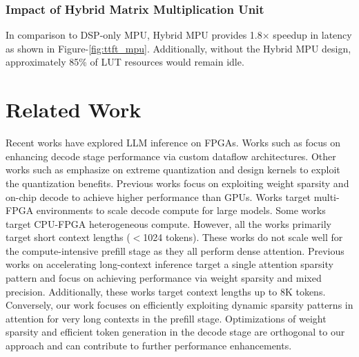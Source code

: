 \documentclass[conference]{IEEEtran}
\begin{document}
\subsubsection{Impact of Hybrid Matrix Multiplication Unit}
In comparison to DSP-only MPU, Hybrid MPU provides 1.8$\times$ speedup in latency as shown in Figure-\ref{fig:ttft_mpu}. Additionally, without the Hybrid MPU design, approximately 85\% of LUT resources would remain idle. 

\section{Related Work}
Recent works \cite{flightllm, speedllm, edgellm, embedfpga, lutllm, terrific, cdllm, lembda, tellme, terafly, looplynx} have explored LLM inference on FPGAs. Works such as \cite{embedfpga, terafly, cdllm} focus on enhancing decode stage performance via custom dataflow architectures. Other works such as \cite{terrific, tellme, lutllm} emphasize on extreme quantization and design kernels to exploit the quantization benefits. Previous works \cite{flightllm} focus on exploiting weight sparsity and on-chip decode to achieve higher performance than GPUs. Works \cite{looplynx} target multi-FPGA environments to scale decode compute for large models. Some works \cite{cdllm, edgellm} target CPU-FPGA heterogeneous compute. However, all the works primarily target short context lengths ($<$1024 tokens). These works do not scale well for the compute-intensive prefill stage as they all perform dense attention. Previous works on accelerating long-context inference \cite{accllm} target a single attention sparsity pattern and focus on achieving performance via weight sparsity and mixed precision. Additionally, these works target context lengths up to 8K tokens. Conversely, our work focuses on efficiently exploiting dynamic sparsity patterns in attention for very long contexts in the prefill stage. Optimizations of weight sparsity and efficient token generation in the decode stage are orthogonal to our approach and can contribute to further performance enhancements.
\end{document}
